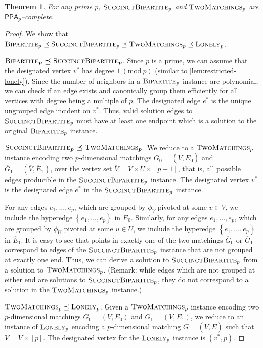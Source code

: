 \documentclass[10pt,a4paper]{article}
\newtheorem{theorem}{Theorem}
\theoremstyle{definition}
\theoremstyle{remark}
\newcommand{\contour}[2]{#2}
\newcommand{\inparen}[1]{\left ( #1 \right )}
\renewcommand{\mod}[1]{~\inparen{\mathrm{mod}~#1}}
\def\set#1{\left\{#1\right\}}
\newcommand{\parasc}[1]{\noindent \contour{black}{#1}}
\newcommand{\class}[1]{\ensuremath{\mathsf{#1}}\xspace}
\newcommand{\PPA}{\class{PPA}}
\newcommand{\pnum}{p}
\newcommand{\bipartitep}{\ensuremath{\textsc{Bipartite}_{\pnum}}}
\newcommand{\twoMatchingsp}{\ensuremath{\textsc{TwoMatchings}_{\pnum}}}
\newcommand{\sucBipartitep}{\ensuremath{\textsc{SuccinctBipartite}_{\pnum}}}
\newcommand{\lonely}{\ensuremath\textsc{Lonely}}
\newcommand{\bipartite}{\ensuremath{\textsc{Bipartite}}}
\newcommand{\twoMatchings}{\ensuremath{\textsc{TwoMatchings}}}
\newcommand{\sucBipartite}{\ensuremath{\textsc{SuccinctBipartite}}}
\newcommand{\reducible}{\preceq}
\begin{document}
\begin{theorem}\label{thm:succ-bip-complete}
	For any prime $p$, $\sucBipartite_p$ and $\twoMatchings_p$ are $\PPA_p$--complete.
\end{theorem}
\begin{proof}
We show that $\bipartite_p \reducible \sucBipartite_p \reducible \twoMatchings_p \reducible \lonely_p$.\medskip

\parasc{$\boldsymbol{\bipartitep \reducible \sucBipartitep}$.} Since $p$ is a prime, we can assume that the designated vertex $v^{*}$ has degree $1 \mod{p}$ (similar to \autoref{lem:restricted-lonely}). Since the
number of neighbors in a $\bipartitep$ instance are polynomial, we can
check if an edge exists and canonically group them efficiently for all vertices
with degree being a multiple of $p$. The designated edge $e^{*}$ is the unique ungrouped edge incident on $v^*$. Thus, valid solution edges to $\sucBipartite_p$ must have at least one endpoint which is a solution to the original $\bipartite_p$ instance.\medskip

\parasc{$\boldsymbol{\sucBipartitep \reducible \twoMatchingsp}$.}
We reduce to a $\twoMatchings_p$ instance encoding two $p$-dimensional matchings $\overline{G}_0 = (\overline{V}, \overline{E}_0)$ and $\overline{G}_1 = (\overline{V}, \overline{E}_1)$, over the vertex set $\overline{V} = V \times U \times [p-1]$, that is, all possible edges producible in the $\sucBipartite_p$ instance. The designated vertex $v^*$ is the designated edge $e^*$ in the $\sucBipartite_p$ instance.

For any edges $e_1, \ldots, e_p$, which are grouped by $\phi_V$ pivoted at some $v \in V$, we include the hyperedge $\set{e_1, \ldots, e_p}$ in $\overline{E}_0$. Similarly, for any edges $e_1, \ldots, e_p$, which are grouped by $\phi_U$ pivoted at some $u \in U$, we include the hyperedge $\set{e_1, \ldots, e_p}$ in $\overline{E}_1$. It is easy to see that points in exactly one of the two matchings $\overline{G}_0$ or $\overline{G}_1$ correspond to edges of the $\sucBipartite_p$ instance that are not grouped at exactly one end. Thus, we can derive a solution to $\sucBipartite_p$ from a solution to $\twoMatchings_p$. (Remark: while edges which are not grouped at either end are solutions to $\sucBipartite_p$, they do not correspond to a solution in the $\twoMatchings_p$ instance.) \medskip

\parasc{$\twoMatchings_p \reducible \lonely_p$.} Given a $\twoMatchings_p$ instance encoding two $p$-dimensional matchings $G_0 = (V, E_0)$ and $G_1 = (V, E_1)$, we reduce to an instance of $\lonely_p$ encoding a $p$-dimensional matching $\overline{G} = (\overline{V}, \overline{E})$ such that $\overline{V} = V \times [p]$. The designated vertex for the $\lonely_p$ instance is $(v^*,p)$.


\end{proof}
\end{document}
